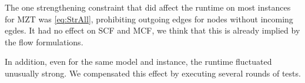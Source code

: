 \documentclass[,%
			paper=a4,%
			DIV14,
			liststotoc,
			bibtotoc,
			draft=false,%
			numbers=noendperiod
			]{scrartcl}
\begin{document}
The one strengthening constraint that did affect the runtime on most instances for MZT was \eqref{eq:StrAll}, prohibiting outgoing edges for nodes without incoming egdes. It had no effect on SCF and MCF, we think that this is already implied by the flow formulations.

In addition, even for the same model and instance, the runtime fluctuated unusually strong.
We compensated this effect by executing several rounds of tests.
\end{document}
